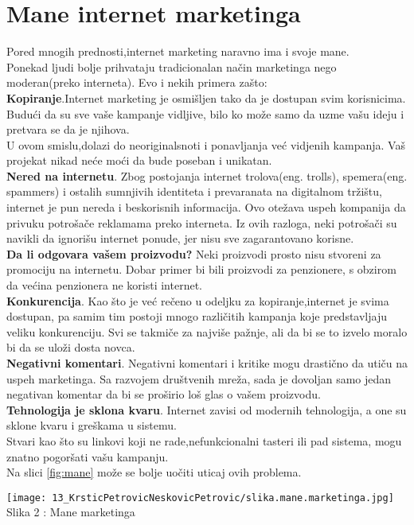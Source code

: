 \documentclass[a4paper]{article}
\begin{document}
{\section{Mane internet marketinga}
\label{sec:mane}
Pored mnogih prednosti,internet marketing naravno ima i svoje mane.
\\Ponekad ljudi bolje prihvataju tradicionalan način marketinga nego moderan(preko interneta). Evo i nekih primera zašto:
\\\textbf{Kopiranje}.Internet marketing je osmišljen tako da je dostupan svim korisnicima. Budući da su sve vaše kampanje vidljive, bilo ko može samo da uzme vašu ideju i pretvara se da je njihova.
\\U ovom smislu,dolazi do neoriginalsnoti i ponavljanja već vidjenih kampanja. Vaš projekat nikad neće moći da bude poseban i unikatan.
\\\textbf{Nered na internetu}.
Zbog postojanja internet trolova(eng. trolls), spemera(eng. spammers) i ostalih sumnjivih identiteta i prevaranata na digitalnom tržištu, internet je pun nereda i beskorisnih informacija. Ovo otežava uspeh kompanija da privuku potrošače reklamama preko interneta. Iz ovih razloga, neki potrošači su navikli da ignorišu internet ponude, jer nisu sve zagarantovano korisne.
\\\textbf{Da li odgovara vašem proizvodu?}
Neki proizvodi prosto nisu stvoreni za promociju na internetu. Dobar primer bi bili proizvodi za penzionere, s obzirom da većina penzionera ne koristi internet.
\\\textbf{Konkurencija}.
Kao što je već rečeno u odeljku za kopiranje,internet je svima dostupan, pa samim tim postoji mnogo različitih kampanja koje predstavljaju veliku konkurenciju. Svi se takmiče za najviše pažnje, ali da bi se to izvelo moralo bi da se uloži dosta novca.
\\\textbf{Negativni komentari}.
Negativni komentari i kritike mogu drastično da utiču na uspeh marketinga. Sa razvojem društvenih mreža, sada je dovoljan samo jedan negativan komentar da bi se proširio loš glas o vašem proizvodu.
\\\textbf{Tehnologija je sklona kvaru}.
 Internet zavisi od modernih tehnologija, a one su sklone kvaru i greškama u sistemu.
\\Stvari kao što su linkovi koji ne rade,nefunkcionalni tasteri ili pad sistema, mogu znatno pogoršati vašu kampanju.
\cite{benefiti i mane}
\\Na slici \ref{fig:mane} može se bolje uočiti uticaj ovih problema.
\begin{center}
    \texttt{[image: 13\_KrsticPetrovicNeskovicPetrovic/slika.mane.marketinga.jpg]}\\
    \large{Slika 2 : Mane marketinga}
\end{center}
\label{fig:mane}
}
\end{document}
